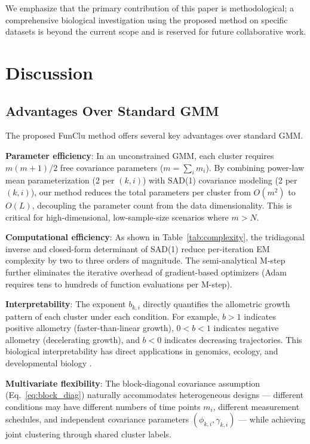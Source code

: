 \documentclass[12pt,a4paper]{article}
\begin{document}
We emphasize that the primary contribution of this paper is methodological; a comprehensive biological investigation using the proposed method on specific datasets is beyond the current scope and is reserved for future collaborative work.

\section{Discussion}

\subsection{Advantages Over Standard GMM}

The proposed FunClu method offers several key advantages over standard GMM.

\textbf{Parameter efficiency}: In an unconstrained GMM, each cluster requires $m(m+1)/2$ free covariance parameters ($m = \sum_i m_i$). By combining power-law mean parameterization (2 per $(k,i)$) with SAD(1) covariance modeling (2 per $(k,i)$), our method reduces the total parameters per cluster from $O(m^2)$ to $O(L)$, decoupling the parameter count from the data dimensionality. This is critical for high-dimensional, low-sample-size scenarios where $m > N$.

\textbf{Computational efficiency}: As shown in Table~\ref{tab:complexity}, the tridiagonal inverse and closed-form determinant of SAD(1) reduce per-iteration EM complexity by two to three orders of magnitude. The semi-analytical M-step further eliminates the iterative overhead of gradient-based optimizers (Adam requires tens to hundreds of function evaluations per M-step).

\textbf{Interpretability}: The exponent $b_{k,i}$ directly quantifies the allometric growth pattern of each cluster under each condition. For example, $b > 1$ indicates positive allometry (faster-than-linear growth), $0 < b < 1$ indicates negative allometry (decelerating growth), and $b < 0$ indicates decreasing trajectories. This biological interpretability has direct applications in genomics, ecology, and developmental biology \cite{weiner2004allocation}.

\textbf{Multivariate flexibility}: The block-diagonal covariance assumption (Eq.~\ref{eq:block_diag}) naturally accommodates heterogeneous designs --- different conditions may have different numbers of time points $m_i$, different measurement schedules, and independent covariance parameters $(\phi_{k,i}, \gamma_{k,i})$ --- while achieving joint clustering through shared cluster labels.
\end{document}
